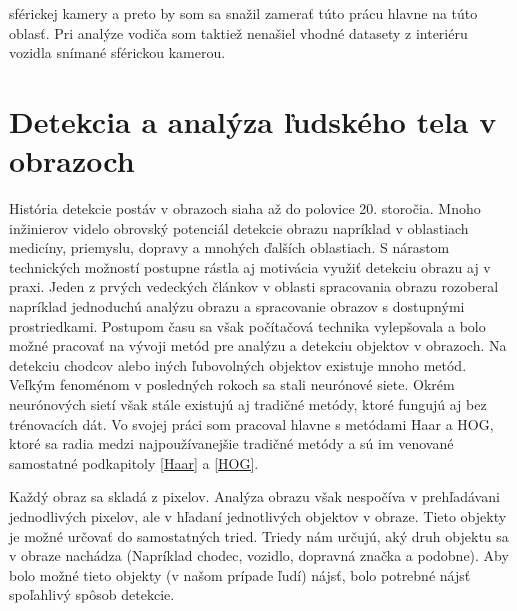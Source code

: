 \documentclass[slovak,master,dept460,male,cpp,cpdeclaration]{diploma}
\begin{document}
sférickej kamery a preto by som sa snažil zamerať túto prácu hlavne na túto oblasť. Pri analýze vodiča som taktiež nenašiel vhodné datasety z interiéru vozidla snímané sférickou kamerou.




\newpage
\section{Detekcia a analýza ľudského tela v obrazoch}
\label{sec:human body decection}

História detekcie postáv v obrazoch siaha až do polovice 20. storočia.  Mnoho inžinierov videlo obrovský potenciál detekcie obrazu napríklad v oblastiach medicíny, priemyslu, dopravy a mnohých ďalších oblastiach. S nárastom technických možností postupne rástla aj motivácia využiť detekciu obrazu aj v praxi. Jeden z prvých vedeckých článkov v oblasti spracovania obrazu \cite{rosenfeld1969} rozoberal napríklad jednoduchú analýzu  obrazu a spracovanie obrazov s dostupnými prostriedkami.  Postupom času sa však počítačová technika vylepšovala a bolo možné pracovať na vývoji metód pre analýzu  a detekciu objektov v obrazoch. Na detekciu chodcov alebo iných ľubovolných objektov existuje mnoho metód. Veľkým fenoménom v posledných rokoch sa stali neurónové siete. Okrém neurónových sietí však stále existujú aj tradičné metódy, ktoré fungujú aj bez trénovacích dát. Vo svojej práci som pracoval hlavne s metódami Haar a HOG, ktoré sa radia medzi najpoužívanejšie tradičné metódy a sú im venované samostatné podkapitoly \ref{Haar} a \ref{HOG}.\par
Každý obraz sa skladá z pixelov. Analýza obrazu však nespočíva v prehľadávani jednodlivých pixelov, ale v hľadaní jednotlivých objektov v obraze. Tieto objekty je možné  určovať do  samostatných tried. Triedy nám určujú, aký druh objektu sa v obraze nachádza (Napríklad chodec, vozidlo, dopravná značka a podobne). Aby bolo možné tieto objekty (v našom prípade ľudí) nájsť, bolo potrebné nájsť spoľahlivý spôsob detekcie. 
\end{document}
